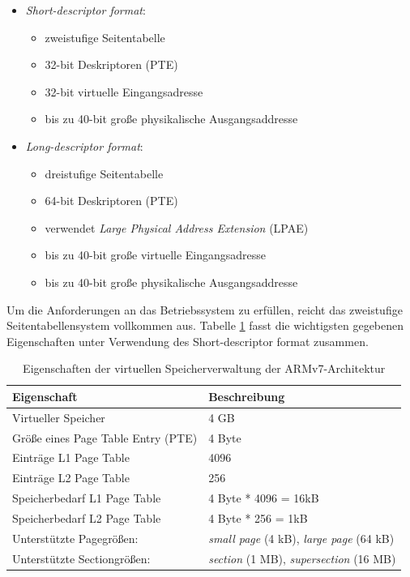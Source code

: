 \begin{itemize}
	\item \emph{Short-descriptor format}:
	\begin{itemize}
		\item zweistufige Seitentabelle 
		\item 32-bit Deskriptoren (PTE)
		\item 32-bit virtuelle Eingangsadresse 
		\item bis zu 40-bit große physikalische Ausgangsaddresse
	\end{itemize}
	\item \emph{Long-descriptor format}:
	\begin{itemize}
		\item dreistufige Seitentabelle
		\item 64-bit Deskriptoren (PTE)
		\item verwendet \emph{Large Physical Address Extension} (LPAE)
		\item bis zu 40-bit große virtuelle Eingangsadresse 
		\item bis zu 40-bit große physikalische Ausgangsaddresse
	\end{itemize}
\end{itemize}

Um die Anforderungen an das Betriebssystem zu erfüllen, reicht das zweistufige Seitentabellensystem vollkommen aus. Tabelle \ref{table:GeneralVirtualMemory} fasst die wichtigsten gegebenen Eigenschaften unter Verwendung des Short-descriptor format zusammen.\\

\begin{table}[H]
\begin{tabular}{p{7cm} | p{7cm}}
  \textbf{Eigenschaft} & \textbf{Beschreibung} \\ \hline
  Virtueller Speicher & 4 GB\\  
  Größe eines Page Table Entry (PTE) & 4 Byte \\
  Einträge L1 Page Table & 4096\\
  Einträge L2 Page Table & 256\\
  Speicherbedarf L1 Page Table & 4 Byte * 4096 = 16kB \\
  Speicherbedarf L2 Page Table & 4 Byte * 256 = 1kB\\
  Unterstützte Pagegrößen: & \emph{small page} (4 kB), \emph{large page} (64 kB)\\
  Unterstützte Sectiongrößen: & \emph{section} (1 MB), \emph{supersection} (16 MB)\\
 \end{tabular}
 \caption{Eigenschaften der virtuellen Speicherverwaltung der ARMv7-Architektur}
 \label{table:GeneralVirtualMemory}
\end{table}

